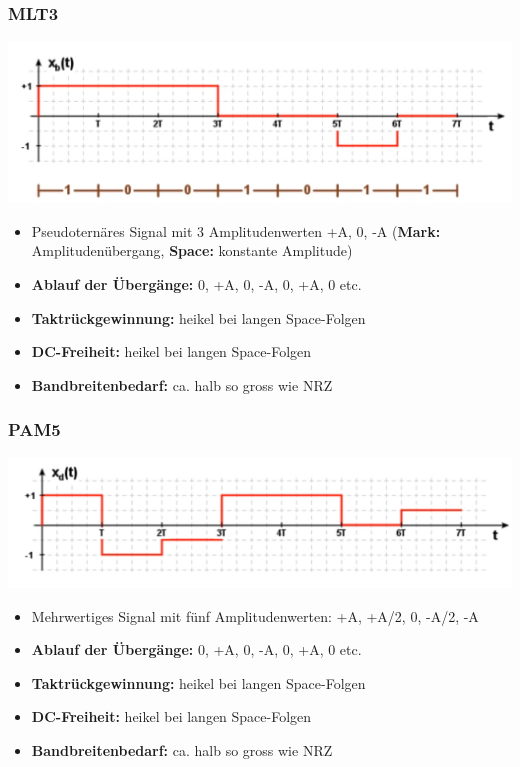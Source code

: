 \subsubsection{MLT3}
\begin{center}
	\includegraphics[width=0.6\columnwidth]{Images/mlt3}
\end{center}
\begin{itemize}[nosep]
	\item Pseudoternäres Signal mit 3 Amplitudenwerten +A, 0, -A (\textbf{Mark:} Amplitudenübergang, \textbf{Space:} konstante Amplitude)
	\item \textbf{Ablauf der Übergänge:} 0, +A, 0, -A, 0, +A, 0 etc.
	\item \textbf{Taktrückgewinnung:} heikel bei langen Space-Folgen
	\item \textbf{DC-Freiheit:} heikel bei langen Space-Folgen
	\item \textbf{Bandbreitenbedarf:} ca. halb so gross wie NRZ
\end{itemize}

\subsubsection{PAM5}
\begin{center}
	\includegraphics[width=0.6\columnwidth]{Images/pam5}
\end{center}
\begin{itemize}[nosep]
	\item Mehrwertiges Signal mit fünf Amplitudenwerten: +A, +A/2, 0, -A/2, -A
	\item \textbf{Ablauf der Übergänge:} 0, +A, 0, -A, 0, +A, 0 etc.
	\item \textbf{Taktrückgewinnung:} heikel bei langen Space-Folgen
	\item \textbf{DC-Freiheit:} heikel bei langen Space-Folgen
	\item \textbf{Bandbreitenbedarf:} ca. halb so gross wie NRZ
\end{itemize}

